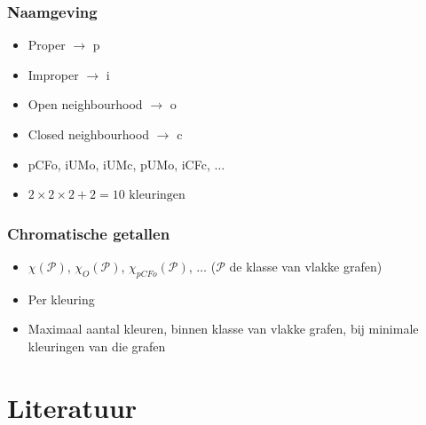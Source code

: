 \documentclass
[kulak] %
{kulakbeamer}
\begin{document}
	\begin{frame}
		\frametitle{Naamgeving}
		
		\begin{itemize}
			\item Proper $\rightarrow$ p
			\item Improper $\rightarrow$ i
			\item Open neighbourhood $\rightarrow$ o
			\item Closed neighbourhood $\rightarrow$ c
			\item pCFo, iUMo, iUMc, pUMo, iCFc, $\dots$
			\item $2 \times 2 \times 2 + 2 = 10 \text{ kleuringen}$
		\end{itemize}
	\end{frame}
	
	\begin{frame}
		\frametitle{Chromatische getallen}
		\begin{itemize}
			\item $\chi(\mathcal{P})$, $\chi_{O}(\mathcal{P})$, $\chi_{pCFo}(\mathcal{P})$, $\dots$ ($\mathcal{P}$ de klasse van vlakke grafen)
			\item Per kleuring
			\item Maximaal aantal kleuren, binnen klasse van vlakke grafen, bij minimale kleuringen van die grafen
			
		\end{itemize}
	\end{frame}
	
	\section{Literatuur}
	
\end{document}
